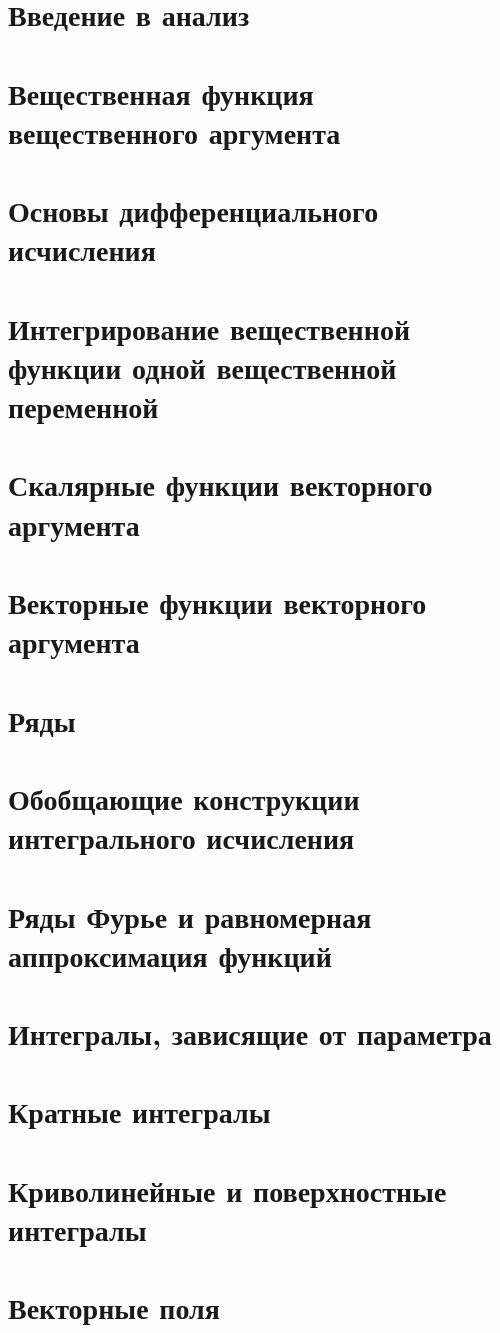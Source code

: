 
\LARGE


\tableofcontents %
\LARGE

\chapter{Введение в анализ}

\chapter{Вещественная функция вещественного аргумента}

\chapter{Основы дифференциального исчисления}

\chapter{Интегрирование вещественной функции одной вещественной переменной}

\chapter{Скалярные функции векторного аргумента}

\chapter{Векторные функции векторного аргумента}

\chapter{Ряды}

\chapter{Обобщающие конструкции интегрального исчисления}

\chapter{Ряды Фурье и равномерная аппроксимация функций}

\chapter{Интегралы, зависящие от параметра}

\chapter{Кратные интегралы}

\chapter{Криволинейные и поверхностные интегралы}

\chapter{Векторные поля}



